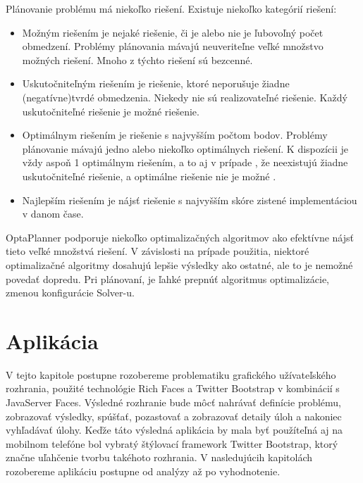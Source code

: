 Plánovanie problému má niekoľko riešení. Existuje niekoľko kategórií riešení:
\begin{itemize}
\item Možným riešením je nejaké riešenie, či je alebo nie je ľubovoľný počet obmedzení. Problémy plánovania mávajú neuveriteľne veľké množstvo možných riešení. Mnoho z týchto riešení sú bezcenné.
\item Uskutočniteľným riešením je riešenie, ktoré neporušuje žiadne (negatívne)tvrdé obmedzenia. Niekedy nie sú realizovateľné riešenie. Každý uskutočniteľné riešenie je možné riešenie.

\item Optimálnym riešením je riešenie s najvyšším počtom bodov. Problémy plánovanie mávajú jedno alebo niekoľko optimálnych riešení. K dispozícii je vždy aspoň 1 optimálnym riešením, a to aj v prípade , že neexistujú žiadne uskutočniteľné riešenie, a optimálne riešenie nie je možné .
\item Najlepším riešením je nájsť riešenie s najvyšším skóre zistené implementáciou v danom čase.

\end{itemize}

OptaPlanner podporuje niekoľko optimalizačných algoritmov ako efektívne nájsť tieto veľké množstvá riešení. V závislosti na prípade použitia, niektoré optimalizačné algoritmy dosahujú lepšie výsledky ako ostatné, ale to je nemožné povedať dopredu. Pri plánovaní, je ľahké prepnúť algoritmus optimalizácie, zmenou konfigurácie Solver-u.


\newpage


\chapter{Aplikácia}\label{impl}
V tejto kapitole postupne rozobereme problematiku grafického užívateľského rozhrania, použité technológie Rich Faces a Twitter Bootstrap v kombinácií s JavaServer Faces. Výsledné rozhranie bude môcť nahrávať definície problému, zobrazovať výsledky, spúšťať, pozastovať a zobrazovať detaily úloh a nakoniec vyhľadávať úlohy. Keďže táto výsledná aplikácia by mala byť použíteľná aj na mobilnom telefóne bol vybratý štýlovací framework Twitter Bootstrap, ktorý značne uľahčenie tvorbu takéhoto rozhrania. V nasledujúcih kapitolách rozobereme aplikáciu postupne od analýzy až po vyhodnotenie.


